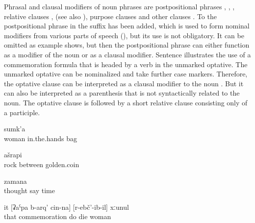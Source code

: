 Phrasal and clausal modifiers of noun phrases are postpositional phrases , , , relative clauses ,  (see also ), purpose clauses  and other clauses . To the postpositional phrase in  the suffix  has been added, which is used to form nominal modifiers from various parts of speech (), but its use is not obligatory. It can be omitted as example  shows, but then the postpositional phrase can either function as a modifier of the noun or as a clausal modifier. Sentence  illustrates the use of a commemoration formula that is headed by a verb in the unmarked optative. The unmarked optative can be nominalized and take further case markers. Therefore, the optative clause can be interpreted as a clausal modifier to the noun  . But it can also be interpreted as a parenthesis that is not syntactically related to the noun. The optative clause is followed by a short relative clause consisting only of a participle.
%
\begin{exe}

		\ex	\label{ex:the bag in the hands of the woman@9b}
			sumk'a\\
			woman	in.the.hands	bag\\
		\glt	{}
	
		\ex	\label{ex:the golden coin between the rocks}
			ašrapi\\
			rock	between	golden.coin\\
		\glt	{}
	
		\ex	\label{ex:time to think}
		\gll	[pikri	Ø-ik'ʷ-ij]	zamana\\
			thought	say	time\\
		\glt	{}
	
		\ex	\label{ex:that dead woman, may she rest in peace@9c}
		\gll	it	[ʡaˁpa	b-arq'	cin-na]	[r-ebč'-ib-il]	xːunul\\
			that	commemoration	do		die	woman\\
		\glt	{}

\end{exe}


